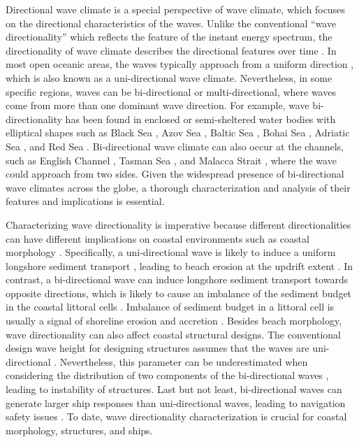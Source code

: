 Directional wave climate is a special perspective of wave climate, which focuses
on the directional characteristics of the waves. Unlike the conventional “wave
directionality” which reflects the feature of the instant energy spectrum, the
directionality of wave climate describes the directional features over time
\citep{wiggins_coastal_2019,wiggins_regionally-coherent_2019}. In most open
oceanic areas, the waves typically approach from a uniform direction
\citep{echevarria_seasonal_2019, echevarria_influence_2020}, which is also known
as a uni-directional wave climate. Nevertheless, in some specific regions, waves
can be bi-directional or multi-directional, where waves come from more than one
dominant wave direction. For example, wave bi-directionality has been found in
enclosed or semi-sheltered water bodies with elliptical shapes such as Black Sea
\citep{gippius_black_2020}, Azov Sea \citep{amarouche_wind-sea_2024}, Baltic Sea
\citep{mannikus_directional_2023}, Bohai Sea \citep{miao_study_2024}, Adriatic
Sea \citep{mannikus_directional_2023}, and Red Sea \citep{shamji_extreme_2020}.
Bi-directional wave climate can also occur at the channels, such as English
Channel \citep{wiggins_regionally-coherent_2019}, Tasman Sea
\citep{mortlock_directional_2015}, and Malacca Strait
\citep{aboobacker_wave_2017}, where the wave could approach from two sides.
Given the widespread presence of bi-directional wave climates across the globe,
a thorough characterization and analysis of their features and implications is
essential.

Characterizing wave directionality is imperative because different
directionalities can have different implications on coastal environments such as
coastal morphology \citep{ranasinghe_southern_2004}. Specifically, a
uni-directional wave is likely to induce a uniform longshore sediment transport
\citep{scott_role_2021}, leading to beach erosion at the updrift extent
\citep{klein_short-term_2002}. In contrast, a bi-directional wave can induce
longshore sediment transport towards opposite directions, which is likely to
cause an imbalance of the sediment budget in the coastal littoral cells
\citep{usace_cem_2002}. Imbalance of sediment budget in a littoral cell is
usually a signal of shoreline erosion and accretion
\citep{hapke_review_2010,lopez-olmedilla_effect_2022}. Besides beach morphology,
wave directionality can also affect coastal structural designs. The conventional
design wave height for designing structures assumes that the waves are
uni-directional \citep{sanil_kumar_design_2004}. Nevertheless, this parameter
can be underestimated when considering the distribution of two components of the
bi-directional waves \citep{sanil_kumar_design_2004}, leading to instability of
structures. Last but not least, bi-directional waves can generate larger ship
responses than uni-directional waves, leading to navigation safety issues
\citep{huang_cfd_2021}. To date, wave directionality characterization is crucial
for coastal morphology, structures, and ships.

